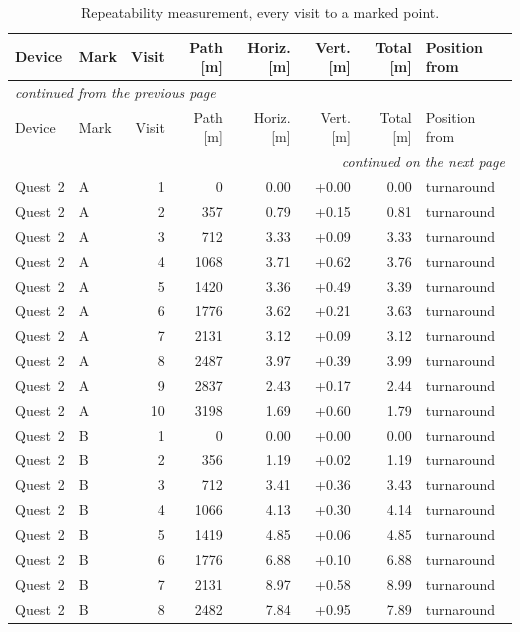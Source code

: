 \documentclass[11pt,a4paper]{article}
\begin{document}
{\footnotesize\setlength{\tabcolsep}{5pt}
\begin{longtable}{llrrrrrl}
\caption{Repeatability measurement, every visit to a marked point.}\label{tab:S7}\\
\toprule
Device & Mark & Visit & Path [m] & Horiz. [m] & Vert. [m] & Total [m] & Position from \\
\midrule
\endfirsthead
\multicolumn{8}{l}{\footnotesize\itshape continued from the previous page}\\
\toprule
Device & Mark & Visit & Path [m] & Horiz. [m] & Vert. [m] & Total [m] & Position from \\
\midrule
\endhead
\midrule
\multicolumn{8}{r}{\footnotesize\itshape continued on the next page}\\
\endfoot
\bottomrule
\endlastfoot
Quest~2 & A & 1 & 0 & 0.00 & +0.00 & 0.00 & turnaround \\
Quest~2 & A & 2 & 357 & 0.79 & +0.15 & 0.81 & turnaround \\
Quest~2 & A & 3 & 712 & 3.33 & +0.09 & 3.33 & turnaround \\
Quest~2 & A & 4 & 1068 & 3.71 & +0.62 & 3.76 & turnaround \\
Quest~2 & A & 5 & 1420 & 3.36 & +0.49 & 3.39 & turnaround \\
Quest~2 & A & 6 & 1776 & 3.62 & +0.21 & 3.63 & turnaround \\
Quest~2 & A & 7 & 2131 & 3.12 & +0.09 & 3.12 & turnaround \\
Quest~2 & A & 8 & 2487 & 3.97 & +0.39 & 3.99 & turnaround \\
Quest~2 & A & 9 & 2837 & 2.43 & +0.17 & 2.44 & turnaround \\
Quest~2 & A & 10 & 3198 & 1.69 & +0.60 & 1.79 & turnaround \\
\addlinespace
Quest~2 & B & 1 & 0 & 0.00 & +0.00 & 0.00 & turnaround \\
Quest~2 & B & 2 & 356 & 1.19 & +0.02 & 1.19 & turnaround \\
Quest~2 & B & 3 & 712 & 3.41 & +0.36 & 3.43 & turnaround \\
Quest~2 & B & 4 & 1066 & 4.13 & +0.30 & 4.14 & turnaround \\
Quest~2 & B & 5 & 1419 & 4.85 & +0.06 & 4.85 & turnaround \\
Quest~2 & B & 6 & 1776 & 6.88 & +0.10 & 6.88 & turnaround \\
Quest~2 & B & 7 & 2131 & 8.97 & +0.58 & 8.99 & turnaround \\
Quest~2 & B & 8 & 2482 & 7.84 & +0.95 & 7.89 & turnaround \\

\end{longtable}}
\end{document}
